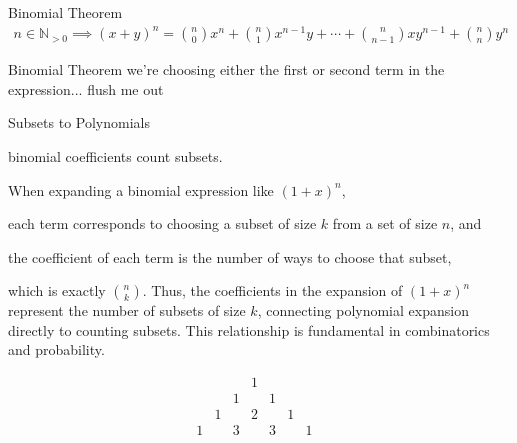 \documentclass[openany, 12pt]{book}
\begin{document}
\begin{definition}{Binomial Theorem}{}
	\begin{align*}
		n       \in \mathbb{N}_{>0} \implies
		(x+y)^n =\binom{n}{0}
		x^n+\binom{n}{1} x^{n-1} y
		+\cdots+\binom{n}{n-1} x y^{n-1}+\binom{n}{n} y^n
	\end{align*}
\end{definition}

\begin{intuition}{Binomial Theorem}{}
	we're choosing either the first or second term in the expression...
	flush me out
\end{intuition}

\begin{intuition}{Subsets to Polynomials}{}
	\begin{alist}
		\item
		\item binomial coefficients count subsets.
		\item When expanding a binomial expression like $(1+x)^n$,
		\item each term corresponds to choosing a subset of size $k$ from a set of size $n$, and
		\item the coefficient of each term is the number of ways to choose that subset,
		\item which is exactly \(\binom{n}{k}\). Thus, the coefficients in the expansion of
		\((1+x)^n\) represent the number of subsets of size \(k\), connecting
		polynomial expansion directly to counting subsets. This relationship is
		fundamental in combinatorics and probability.
	\end{alist}
\end{intuition}

\[
	\begin{array}{cccccccc}
		  &   &   & 1 &   &   &   & \\
		  &   & 1 &   & 1 &   &   & \\
		  & 1 &   & 2 &   & 1 &   & \\
		1 &   & 3 &   & 3 &   & 1 & \\
	\end{array}
\]
\end{document}

